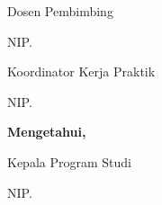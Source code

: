 \noindent
\begin{minipage}[t]{0.46\textwidth}
  \centering
  {\FontPengesahanIsi Dosen Pembimbing\par}
  \vspace{1.2cm}
  {\bfseries\FontPengesahanIsi \NamaPembimbing}\par
  \vspace{0.15cm}
  {\FontPengesahanIsi NIP. \NIPPembimbing\par}
\end{minipage}%
\hfill
\begin{minipage}[t]{0.46\textwidth}
  \centering
  {\FontPengesahanIsi Koordinator Kerja Praktik\par}
  \vspace{1.2cm}
  {\bfseries\FontPengesahanIsi \NamaKoordinatorKP}\par
  \vspace{0.15cm}
  {\FontPengesahanIsi NIP. \NIPKoordinatorKP\par}
\end{minipage}

\vspace{0.7cm}

\begin{center}{\FontPengesahanIsi\bfseries Mengetahui,}\end{center}
\vspace{0.2cm}

\begin{center}
  {\FontPengesahanIsi Kepala Program Studi \JenjangProdi\ \NamaProdi\par}
  \vspace{1.2cm}
  {\bfseries\FontPengesahanIsi \NamaKetuaProdi}\par
  \vspace{0.15cm}
  {\FontPengesahanIsi NIP. \NIPKetuaProdi\par}
\end{center}
\thispagestyle{empty} %
